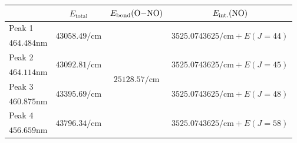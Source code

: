 \documentclass[aspectratio=43,scheme=plain]{ctexbeamer}
\begin{document}
	\begin{frame}{\insertsubsection}
		\begin{table}[htbp]
			\centering
			\tiny
			\begin{tabularx}{0.9\textwidth}{lccc}
				& $E_\text{total}$ & $E_\text{bond}(\ce{O-NO})$\footfullcite{ono} & $E_\text{int.}(\ce{NO})$ \\
				\toprule
				Peak 1 & \multirow{2}[2]{*}{$\num{43058.49}\unit{\per \centi \meter}$} & \multirow{8}[8]{*}{$\num{25128.57}\unit{\per \centi \meter}$} & \multirow{2}[2]{*}{$\num{3525.0743625}\unit{\per \centi \meter}+ E( J = 44 )$} \\
				$\num{464.484}\unit{\nano\meter}$ & & & \\
				\cmidrule{1-2}\cmidrule{4-4}
				Peak 2 & \multirow{2}[2]{*}{$\num{43092.81}\unit{\per \centi \meter}$} & & \multirow{2}[2]{*}{$\num{3525.0743625}\unit{\per \centi \meter}+ E( J = 45 )$} \\
				$\num{464.114}\unit{\nano\meter}$ & & & \\
				\cmidrule{1-2}\cmidrule{4-4}
				Peak 3 & \multirow{2}[2]{*}{$\num{43395.69}\unit{\per \centi \meter}$} & & \multirow{2}[2]{*}{$\num{3525.0743625}\unit{\per \centi \meter}+ E( J = 48 )$} \\
				$\num{460.875}\unit{\nano\meter}$ & & & \\
				\cmidrule{1-2}\cmidrule{4-4}
				Peak 4 & \multirow{2}[2]{*}{$\num{43796.34}\unit{\per \centi \meter}$} & & \multirow{2}[2]{*}{$\num{3525.0743625}\unit{\per \centi \meter}+ E( J = 58 )$} \\
				$\num{456.659}\unit{\nano\meter}$ & & & \\
				\bottomrule
			\end{tabularx}
		\end{table}
	\end{frame}	
\end{document}
